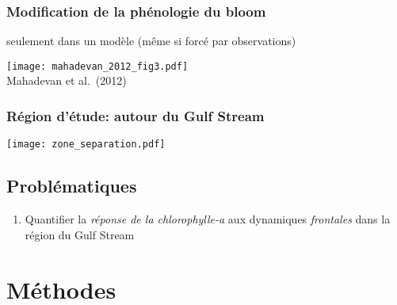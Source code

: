 
\begin{frame}
  \frametitle{Modification de la phénologie du bloom}
  seulement dans un modèle (même si forcé par observations)

  \begin{block}{}
    \texttt{[image: mahadevan\_2012\_fig3.pdf]}
    \\
    Mahadevan et al.\ (2012)
  \end{block}
\end{frame}


\begin{frame}
  \frametitle{Région d'étude: autour du Gulf Stream}


  \vfill

  \texttt{[image: zone\_separation.pdf]}
\end{frame}


\subsection{Problématiques}

\begin{frame}
  \vspace{2em}

  \begin{enumerate}
    \setlength{\itemsep}{1em}
    \item Quantifier la \emph{réponse de la chlorophylle-a} aux dynamiques \emph{frontales} dans la région du Gulf Stream
  \end{enumerate}
\end{frame}


\section*{Méthodes}

